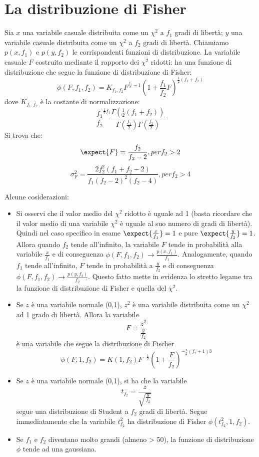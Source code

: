\section{La distribuzione di Fisher}

Sia $x$ una variabile casuale distribuita come un $\chi^2$ a $f_1$
gradi di libert\`a; $y$ una variabile casuale distribuita come un
$\chi^2$ a $f_2$ gradi di libert\`a. Chiamiamo $p(x,f_1)$ e $p(y,f_2)$
le corrispondenti funzioni di distribuzione.
La variabile casuale $F$
costruita mediante il rapporto dei $\chi^2$ ridotti:
ha una funzione di distribuzione che segue la funzione di
distribuzione di Fisher:
$$
\phi(F,f_1,f_2) =
K_{f_1,f_2}F^{\frac{f_1}{2}-1}(1+\frac{f_1}{f_2}F)^{\frac{1}{2}(f_1+f_2)}
$$
dove $K_{f_1,f_2}$ \`e la costante di normalizzazione:
$$
\frac{f_1}{f_2}^{\frac{1}{2}f_1}
\frac{\Gamma(\frac{1}{2}(f_1+f_2))}{\Gamma(\frac{f_1}{2})\Gamma(\frac{f_2}{2})}
$$
Si trova che:
$$
\expect{F} = \frac{f_2}{f_2-2}, per f_2 > 2
$$
$$
\sigma_F^2=\frac{2f_2^2(f_1+f_2-2)}{f_1(f_2-2)^2(f_2-4)}, per f_2 > 4
$$

\noindent Alcune cosiderazioni:
\begin{itemize}
\item Si osservi che il valor medio del $\chi^2$ ridotto \`e
uguale ad 1 (basta ricordare che il valor medio di una variabile
$\chi^2$ \`e uguale al suo numero di gradi di libert\`a). Quindi nel caso
specifico in esame  $\expect{\frac{x}{f_1}} = 1$ e pure
$\expect{\frac{y}{f_2}} = 1$.
Allora quando $f_2$ tende all'infinito, la variabile $F$ tende in
probabilit\`a  alla variabile
$\frac{x}{f_1}$ e di conseguenza $\phi(F,f_1,f_2) \rightarrow
\frac{p(x,f_1)}{f_1}$. Analogamente, quando $f_1$ tende all'infinito,
$F$ tende in probabilit\`a a
$\frac{y}{f_2}$ e di conseguenza $\phi(F,f_1,f_2) \rightarrow
\frac{p(y,f_2)}{f_2}$. Questo fatto mette in evidenza lo stretto
legame tra la funzione di distribuzione di Fisher e quella del $\chi^2$.
\item Se $z$ \`e una variabile normale (0,1), $z^2$ \`e una variabile
  distribuita come un  $\chi^2$ ad 1 grado di libert\`a. Allora la
  variabile
$$F=\frac{z^2}{\frac{y}{f_2}}$$
\`e una variabile che segue la distribuzione di Fischer
$$
\phi(F,1,f_2)=K(1,f_2)F^{-\frac{1}{2}}(1+\frac{F}{f_2})^{-\frac{1}{2}(f_2+1)3}
$$
\item Se $z$ \`e una variabile normale (0,1), si ha che la variabile
$$t_{f_2}=\frac{z}{\sqrt{\frac{y}{f_2}}}$$
  segue una distribuzione di Student a $f_2$ gradi di libert\`a.
Segue immediatamente che la variabile $t_{f_2}^2$ ha distribuzione di
  Fisher $\phi(t_{f_2}^2,1,f_2)$.
\item Se $f_1$ e $f_2$ diventano molto grandi (almeno > 50), la funzione di
  distribuzione $\phi$ tende ad una gaussiana.
\end{itemize}

